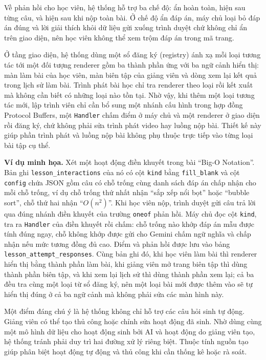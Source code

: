 \documentclass[../DoAn.tex]{subfiles}
\begin{document}
Về phản hồi cho học viên, hệ thống hỗ trợ ba chế độ: ẩn hoàn toàn, hiện sau từng câu, và hiện sau khi nộp toàn bài. Ở chế độ ẩn đáp án, máy chủ loại bỏ đáp án đúng và lời giải thích khỏi dữ liệu gửi xuống trình duyệt chứ không chỉ ẩn trên giao diện, nên học viên không thể xem trộm đáp án trong mã trang.

Ở tầng giao diện, hệ thống dùng một sổ đăng ký (registry) ánh xạ mỗi loại tương tác tới một đối tượng renderer gồm ba thành phần ứng với ba ngữ cảnh hiển thị: màn làm bài của học viên, màn biên tập của giảng viên và dòng xem lại kết quả trong lịch sử làm bài. Trình phát bài học chỉ tra renderer theo loại rồi kết xuất mà không cần biết có những loại nào tồn tại. Nhờ vậy, khi thêm một loại tương tác mới, lập trình viên chỉ cần bổ sung một nhánh cấu hình trong hợp đồng Protocol Buffers, một \texttt{Handler} chấm điểm ở máy chủ và một renderer ở giao diện rồi đăng ký, chứ không phải sửa trình phát video hay luồng nộp bài. Thiết kế này giúp phần trình phát và luồng nộp bài không phụ thuộc trực tiếp vào từng loại bài tập cụ thể.

\textbf{Ví dụ minh họa.} Xét một hoạt động điền khuyết trong bài ``Big-O Notation''. Bản ghi \texttt{lesson\_interactions} của nó có cột \texttt{kind} bằng \texttt{fill\_blank} và cột \texttt{config} chứa JSON gồm câu có chỗ trống cùng danh sách đáp án chấp nhận cho mỗi chỗ trống, ví dụ chỗ trống thứ nhất nhận ``sắp xếp nổi bọt'' hoặc ``bubble sort'', chỗ thứ hai nhận ``$O(n^2)$''. Khi học viên nộp, trình duyệt gửi câu trả lời qua đúng nhánh điền khuyết của trường \texttt{oneof} phản hồi. Máy chủ đọc cột \texttt{kind}, tra ra \texttt{Handler} của điền khuyết rồi chấm: chỗ trống nào khớp đáp án mẫu được tính đúng ngay, chỗ không khớp được gửi cho Gemini chấm ngữ nghĩa và chấp nhận nếu mức tương đồng đủ cao. Điểm và phản hồi được lưu vào bảng \texttt{lesson\_attempt\_responses}. Cùng bản ghi đó, khi học viên làm bài thì renderer hiển thị bằng thành phần làm bài, khi giảng viên mở trang biên tập thì dùng thành phần biên tập, và khi xem lại lịch sử thì dùng thành phần xem lại; cả ba đều tra cùng một loại từ sổ đăng ký, nên một loại bài mới được thêm vào sẽ tự hiển thị đúng ở cả ba ngữ cảnh mà không phải sửa các màn hình này.

Một điểm đáng chú ý là hệ thống không chỉ hỗ trợ các câu hỏi sinh tự động. Giảng viên có thể tạo thủ công hoặc chỉnh sửa hoạt động đã sinh. Nhờ dùng cùng một mô hình dữ liệu cho hoạt động sinh bởi AI và hoạt động do giảng viên tạo, hệ thống tránh phải duy trì hai đường xử lý riêng biệt. Thuộc tính nguồn tạo giúp phân biệt hoạt động tự động và thủ công khi cần thống kê hoặc rà soát.
\end{document}
